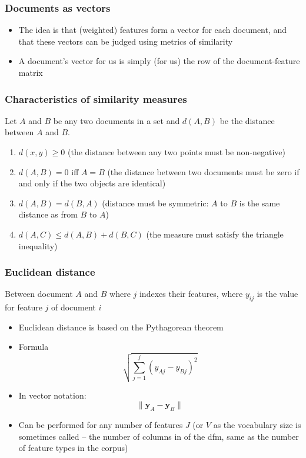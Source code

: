 \documentclass{beamer}
\begin{document}
\begin{frame}
	\frametitle{Documents as vectors}
	\begin{itemize}
		\item The idea is that (weighted) features form a vector for each
		document, and that these vectors can be judged using metrics of \alert{similarity}
		\item A document's vector for us is simply (for us) the row of the
		document-feature matrix
	\end{itemize}
\end{frame}


\begin{frame}
	\frametitle{Characteristics of similarity measures}
	Let $A$ and $B$ be any two documents in a set and $d(A,B)$ be the distance between $A$ and $B$.
	\begin{enumerate}
		\item \alert{$d(x, y) \geq 0$} (the distance between any two points
		must be non-negative)
		\item \alert{$d(A, B) = 0$ iff $A = B$} (the distance between two
		documents must be zero if and only if the two objects are
		identical)
		\item \alert{$d(A, B) = d(B, A)$} (distance must be symmetric: $A$ to
		$B$ is the same distance as from $B$ to $A$)
		\item \alert{$d(A, C) \leq d(A, B) + d(B, C)$} (the measure must satisfy the triangle inequality)
	\end{enumerate}
\end{frame}

\begin{frame}
	\frametitle{Euclidean distance}
	Between document $A$ and $B$ where $j$ indexes their features, where
	$y_{ij}$ is the value for feature $j$ of document $i$
	\begin{itemize}
		\item Euclidean distance is based on the Pythagorean theorem
		\item Formula
		\begin{equation}
		\sqrt{\sum_{j=1}^j (y_{Aj} - y_{Bj})^2}
		\end{equation}
		\item In vector notation:
		\begin{equation}
		\| \mathbf{y}_{A} - \mathbf{y}_{B} \|
		\end{equation}
		\item Can be performed for any number of features $J$ (or $V$ as the
		vocabulary size is sometimes called -- the number of columns in of
		the dfm, same as the number of feature types in the corpus)
	\end{itemize}
\end{frame}
\end{document}
